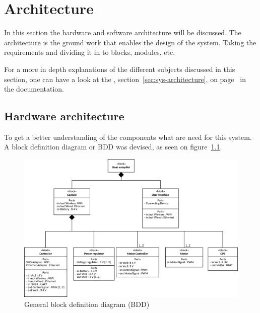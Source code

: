 \newpage
\chapter{Architecture}

In this section the hardware and software architecture will be discussed. The architecture is the ground work that enables the design of the system. Taking the requirements and dividing it in to blocks, modules, etc.

For a more in depth explanations of the different subjects discussed in this section, one can have a look at the , section~\ref{sec:sys-architecture}, on page~\pageref{sec:sys-architecture} in the documentation.

\section{Hardware architecture}
To get a better understanding of the components what are need for this system. A block definition diagram or BDD was devised, as seen on figure~\ref{fig:generalbdd}. 

\begin{figure}[H]
\centering
\includegraphics[width=1\linewidth]{../Appendix/Project/Dokumentation/Images/System_architecture/General_BDD}
\caption{General block definition diagram (BDD)}
\label{fig:generalbdd}
\end{figure}

